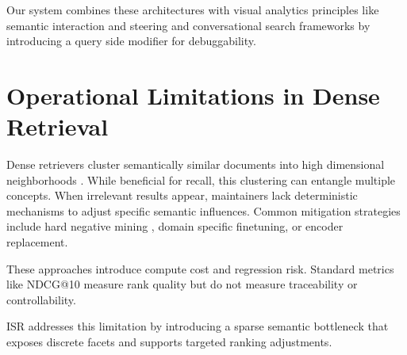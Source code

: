 \documentclass[sigconf,anonymous,screen]{acmart}
\begin{document}
Our system combines these architectures with visual analytics principles like semantic interaction and steering \cite{endert2014human} and conversational search frameworks \cite{radlinski2017framework} by introducing a query side modifier for debuggability.

\section{Operational Limitations in Dense Retrieval}
Dense retrievers cluster semantically similar documents into high dimensional neighborhoods \cite{reimers2019sentence}. While beneficial for recall, this clustering can entangle multiple concepts. When irrelevant results appear, maintainers lack deterministic mechanisms to adjust specific semantic influences. Common mitigation strategies include hard negative mining \cite{karpukhin2020dense, xiong2021ance}, domain specific finetuning, or encoder replacement.

These approaches introduce compute cost and regression risk. Standard metrics like NDCG@10 measure rank quality but do not measure traceability or controllability.

ISR addresses this limitation by introducing a sparse semantic bottleneck that exposes discrete facets and supports targeted ranking adjustments.
\end{document}
